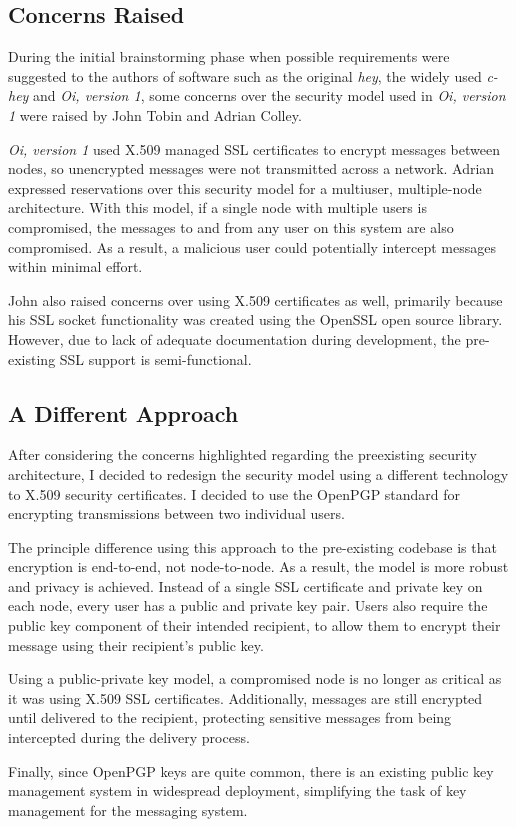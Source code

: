 
\subsection{Concerns Raised}

During the initial brainstorming phase when possible requirements were
suggested to the authors of software such as the original \emph{hey},
the widely used \emph{c-hey} and \emph{Oi, version 1}, some concerns 
over the security model used in \emph{Oi, version 1} were raised by 
John Tobin and Adrian Colley. 


\emph{Oi, version 1} used X.509 managed SSL certificates to encrypt 
messages between nodes, so unencrypted messages were not transmitted 
across a network. Adrian expressed reservations over this security model 
for a multiuser, multiple-node architecture. With this model, if a
single node with multiple users is compromised, the messages to and from
any user on this system are also compromised. As a result, a malicious
user could potentially intercept messages within minimal effort.


John also raised concerns over using X.509 certificates as well,
primarily because his SSL socket functionality was created using the
OpenSSL open source library. However, due to lack of adequate
documentation during development, the pre-existing SSL support is
semi-functional.

\subsection{A Different Approach}

After considering the concerns highlighted regarding the preexisting
security architecture, I decided to redesign the security model using a
different technology to X.509 security certificates. I decided to use the 
OpenPGP standard for encrypting transmissions between two individual 
users.


The principle difference using this approach to the pre-existing
codebase is that encryption is end-to-end, not node-to-node. As a
result, the model is more robust and privacy is achieved. Instead of a
single SSL certificate and private key on each node, every user has a
public and private key pair. Users also require the public key component
of their intended recipient, to allow them to encrypt their message using
their recipient's public key.


Using a public-private key model, a compromised node is no longer as
critical as it was using X.509 SSL certificates. Additionally, messages
are still encrypted until delivered to the recipient, protecting
sensitive messages from being intercepted during the delivery process.


Finally, since OpenPGP keys are quite common, there is an existing
public key management system in widespread deployment, simplifying the
task of key management for the messaging system.
